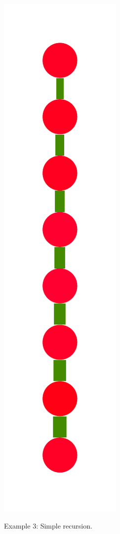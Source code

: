\documentclass[a4paper,10pt]{article}
\begin{document}
\begin{figure}
{    \includegraphics[scale=.14]{./figures/6-3-recursion-induced-8.pdf}
    \label{fig:exp-simple-recursion-induced}    
    }
  \caption{Example 3: Simple recursion.}
  \label{fig:exp-simple-recursion}
\end{figure}
\end{document}
